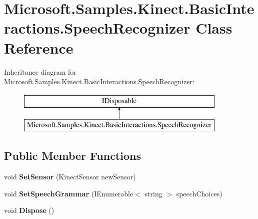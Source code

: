 \hypertarget{class_microsoft_1_1_samples_1_1_kinect_1_1_basic_interactions_1_1_speech_recognizer}{\section{Microsoft.\-Samples.\-Kinect.\-Basic\-Interactions.\-Speech\-Recognizer Class Reference}
\label{class_microsoft_1_1_samples_1_1_kinect_1_1_basic_interactions_1_1_speech_recognizer}
}
Inheritance diagram for Microsoft.\-Samples.\-Kinect.\-Basic\-Interactions.\-Speech\-Recognizer\-:\begin{figure}[H]
\begin{center}
\leavevmode
\includegraphics[height=2.000000cm]{class_microsoft_1_1_samples_1_1_kinect_1_1_basic_interactions_1_1_speech_recognizer}
\end{center}
\end{figure}
\subsection*{Public Member Functions}
\begin{DoxyCompactItemize}
\item 
\hypertarget{class_microsoft_1_1_samples_1_1_kinect_1_1_basic_interactions_1_1_speech_recognizer_a7f977c60952640bbbfa806e7b026cd0b}{void {\bfseries Set\-Sensor} (Kinect\-Sensor new\-Sensor)}\label{class_microsoft_1_1_samples_1_1_kinect_1_1_basic_interactions_1_1_speech_recognizer_a7f977c60952640bbbfa806e7b026cd0b}

\item 
\hypertarget{class_microsoft_1_1_samples_1_1_kinect_1_1_basic_interactions_1_1_speech_recognizer_a9a84fbae3e562115f6bd642fb2f25dc9}{void {\bfseries Set\-Speech\-Grammar} (I\-Enumerable$<$ string $>$ speech\-Choices)}\label{class_microsoft_1_1_samples_1_1_kinect_1_1_basic_interactions_1_1_speech_recognizer_a9a84fbae3e562115f6bd642fb2f25dc9}

\item 
\hypertarget{class_microsoft_1_1_samples_1_1_kinect_1_1_basic_interactions_1_1_speech_recognizer_afba3630800dc30c7e6ccdd3b73928678}{void {\bfseries Dispose} ()}\label{class_microsoft_1_1_samples_1_1_kinect_1_1_basic_interactions_1_1_speech_recognizer_afba3630800dc30c7e6ccdd3b73928678}

\end{DoxyCompactItemize}
